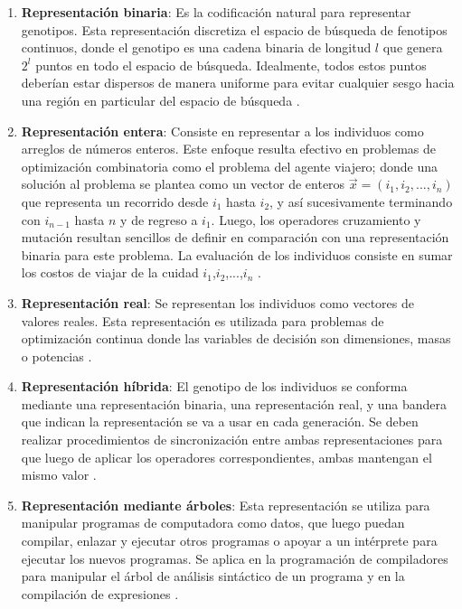 \begin{enumerate}
\item\textbf{Representación binaria}: Es la codificación natural para representar genotipos. Esta representación discretiza el espacio de búsqueda de fenotipos continuos, donde el genotipo es una cadena binaria de longitud $l$ que genera $2^l$ puntos en todo el espacio de búsqueda. Idealmente, todos estos puntos deberían estar dispersos de manera uniforme para evitar cualquier sesgo hacia una región en particular del espacio de búsqueda \cite{chiam_issues_2006}.
\item\textbf{ Representación entera}: Consiste en representar a los individuos como arreglos de números enteros. Este enfoque resulta efectivo en problemas de optimización combinatoria como el problema del agente viajero; donde una solución al problema se plantea como un vector de enteros $\vec{x}=(i_1,i_2,...,i_n)$ que representa un recorrido desde $i_1$ hasta $i_2$, y así sucesivamente terminando con  $i_{n-1}$  hasta $n$ y de regreso a $i_1$. Luego, los operadores cruzamiento y mutación resultan sencillos de definir en comparación con una representación binaria para este problema. La evaluación de los individuos consiste en sumar los costos de viajar de la cuidad $i_1$,$i_2$,...,$i_n$ \cite{michalewicz_genetic_1995}.  
\item\textbf{ Representación real}: Se representan los individuos como vectores de valores reales. Esta representación es utilizada para problemas de optimización continua donde las variables de decisión son dimensiones, masas o potencias \cite{deb_optimization_2004}.
\item\textbf{Representación híbrida}: El genotipo de los individuos se conforma mediante una representación binaria, una representación real, y una bandera que indican la representación se va a usar en cada generación. Se deben realizar procedimientos de sincronización entre ambas representaciones para que luego de aplicar los operadores correspondientes, ambas mantengan el mismo valor \cite{okabe_evolutionary_2003}. 

\item\textbf{Representación mediante árboles}: Esta representación se utiliza para manipular programas de computadora como datos, que luego puedan compilar, enlazar y ejecutar otros programas o apoyar a un intérprete para ejecutar los nuevos programas. Se aplica en la programación de compiladores para manipular el árbol de análisis sintáctico de un programa y en la compilación de expresiones \cite{Koza94geneticprogramming}.
\end{enumerate}


